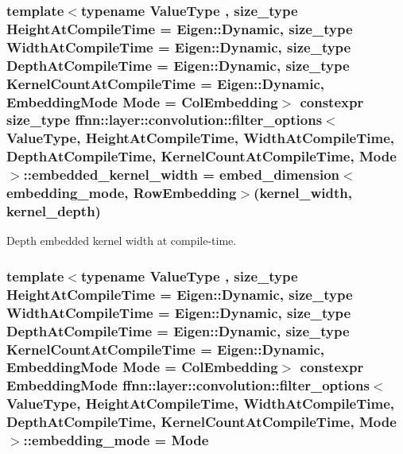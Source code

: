 \hypertarget{structffnn_1_1layer_1_1convolution_1_1filter__options_a2fc1d0f5a96641d9a04c8de7e6f1f0d1}{
\subsubsection[{embedded\-\_\-kernel\-\_\-width}]{\setlength{\rightskip}{0pt plus 5cm}template$<$typename Value\-Type , size\-\_\-type Height\-At\-Compile\-Time = Eigen\-::\-Dynamic, size\-\_\-type Width\-At\-Compile\-Time = Eigen\-::\-Dynamic, size\-\_\-type Depth\-At\-Compile\-Time = Eigen\-::\-Dynamic, size\-\_\-type Kernel\-Count\-At\-Compile\-Time = Eigen\-::\-Dynamic, Embedding\-Mode Mode = Col\-Embedding$>$ constexpr {\bf size\-\_\-type} {\bf ffnn\-::layer\-::convolution\-::filter\-\_\-options}$<$ Value\-Type, Height\-At\-Compile\-Time, Width\-At\-Compile\-Time, Depth\-At\-Compile\-Time, Kernel\-Count\-At\-Compile\-Time, Mode $>$\-::embedded\-\_\-kernel\-\_\-width = {\bf embed\-\_\-dimension}$<${\bf embedding\-\_\-mode}, {\bf Row\-Embedding}$>$({\bf kernel\-\_\-width}, {\bf kernel\-\_\-depth})\hspace{0.3cm}{\ttfamily [static]}}}\label{structffnn_1_1layer_1_1convolution_1_1filter__options_a2fc1d0f5a96641d9a04c8de7e6f1f0d1}


Depth embedded kernel width at compile-\/time. 

\hypertarget{structffnn_1_1layer_1_1convolution_1_1filter__options_a14397f4f0325a7b16fa81ea30b8cb063}{
\subsubsection[{embedding\-\_\-mode}]{\setlength{\rightskip}{0pt plus 5cm}template$<$typename Value\-Type , size\-\_\-type Height\-At\-Compile\-Time = Eigen\-::\-Dynamic, size\-\_\-type Width\-At\-Compile\-Time = Eigen\-::\-Dynamic, size\-\_\-type Depth\-At\-Compile\-Time = Eigen\-::\-Dynamic, size\-\_\-type Kernel\-Count\-At\-Compile\-Time = Eigen\-::\-Dynamic, Embedding\-Mode Mode = Col\-Embedding$>$ constexpr {\bf Embedding\-Mode} {\bf ffnn\-::layer\-::convolution\-::filter\-\_\-options}$<$ Value\-Type, Height\-At\-Compile\-Time, Width\-At\-Compile\-Time, Depth\-At\-Compile\-Time, Kernel\-Count\-At\-Compile\-Time, Mode $>$\-::embedding\-\_\-mode = Mode\hspace{0.3cm}{\ttfamily [static]}}}\label{structffnn_1_1layer_1_1convolution_1_1filter__options_a14397f4f0325a7b16fa81ea30b8cb063}


